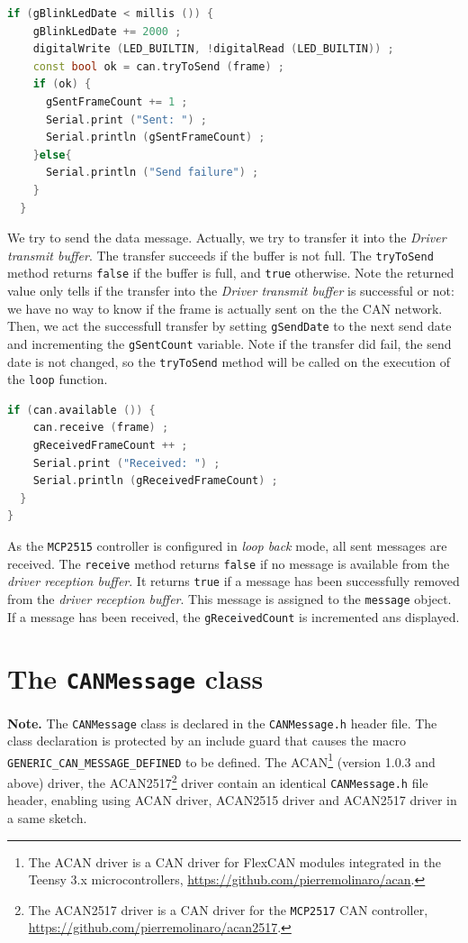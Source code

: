 \documentclass[10pt, a4paper, obeyspaces]{extarticle}
\newcommand \sectionLabel[2]{\section{#1}\label{sec:#2}}
\begin{document}
{ \small\begin{lstlisting}[language=c++]
  if (gBlinkLedDate < millis ()) {
    gBlinkLedDate += 2000 ;
    digitalWrite (LED_BUILTIN, !digitalRead (LED_BUILTIN)) ;
    const bool ok = can.tryToSend (frame) ;
    if (ok) {
      gSentFrameCount += 1 ;
      Serial.print ("Sent: ") ;
      Serial.println (gSentFrameCount) ;
    }else{
      Serial.println ("Send failure") ;
    }
  }
\end{lstlisting}}
We try to send the data message. Actually, we try to transfer it into the \emph{Driver transmit buffer}. The transfer succeeds if the buffer is not full. The \texttt{tryToSend} method returns \texttt{false} if the buffer is full, and \texttt{true} otherwise. Note the returned value only tells if the transfer into the \emph{Driver transmit buffer} is successful or not: we have no way to know if the frame is actually sent on the the CAN network. Then, we act the successfull transfer by setting \texttt{gSendDate} to the next send date and incrementing the \texttt{gSentCount} variable. Note if the transfer did fail, the send date is not changed, so the \texttt{tryToSend} method will be called on the execution of the \texttt{loop} function.


{ \small\begin{lstlisting}[language=c++]
  if (can.available ()) {
    can.receive (frame) ;
    gReceivedFrameCount ++ ;
    Serial.print ("Received: ") ;
    Serial.println (gReceivedFrameCount) ;
  }
}
\end{lstlisting}}
As the \texttt{MCP2515} controller is configured in \emph{loop back} mode, all sent messages are received. The \texttt{receive} method returns \texttt{false} if no message is available from the \emph{driver reception buffer}. It returns \texttt{true} if a message has been successfully removed from the \emph{driver reception buffer}. This message is assigned to the \texttt{message} object. If a message has been received, the \texttt{gReceivedCount} is incremented ans displayed.





\sectionLabel{The \texttt{CANMessage} class}{CANMessageClass}

{\bf Note. } The \texttt{CANMessage} class is declared in the \texttt{CANMessage.h} header file. The class declaration is protected by an include guard that causes the macro \texttt{GENERIC\_CAN\_MESSAGE\_DEFINED} to be defined. The ACAN\footnote{The ACAN driver is a CAN driver for FlexCAN modules integrated in the Teensy 3.x microcontrollers, \url{https://github.com/pierremolinaro/acan}.} (version 1.0.3 and above) driver, the ACAN2517\footnote{The ACAN2517 driver is a CAN driver for the \texttt{MCP2517} CAN controller, \url{https://github.com/pierremolinaro/acan2517}.} driver contain an identical \texttt{CANMessage.h} file header, enabling using ACAN driver, ACAN2515 driver and ACAN2517 driver in a same sketch.
\end{document}

